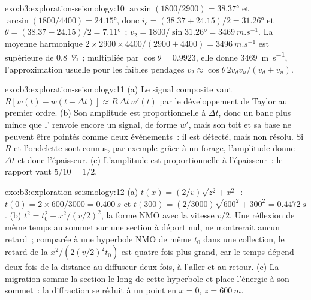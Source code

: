\begin{solution}{exo:b3:exploration-seismology:10}
$\arcsin(1800/2900) = \ang{38.37}$ et $\arcsin(1800/4400) = \ang{24.15}$, donc
$i_c = (38.37 + 24.15)/2 = \ang{31.26}$ et $\theta = (38.37 - 24.15)/2 =
\ang{7.11}$~; $v_2 = 1800/\sin\ang{31.26} = \qty{3469}{m.s^{-1}}$. La moyenne
harmonique $2\times2900\times4400/(2900 + 4400) = \qty{3496}{m.s^{-1}}$ est
supérieure de \qty{0.8}{\percent}~; multipliée par $\cos\theta = 0.9923$, elle donne
\qty{3469}{m.s^{-1}}, l'approximation usuelle pour les faibles pendages
$v_2 \approx \cos\theta\,2v_dv_u/(v_d + v_u)$.
\end{solution}

\begin{solution}{exo:b3:exploration-seismology:11}
(a) Le signal composite vaut $R[w(t) - w(t - \Delta t)] \approx R\,\Delta t\,w'(t)$ par
le développement de Taylor au premier ordre. (b) Son amplitude est proportionnelle à
$\Delta t$, donc un banc plus mince que l' renvoie encore un signal,
de forme $w'$, mais son toit et sa base ne peuvent être pointés comme deux événements~: il
est détecté, mais non résolu. Si $R$ et l'ondelette sont connus, par exemple grâce à un
forage, l'amplitude donne $\Delta t$ et donc l'épaisseur. (c) L'amplitude est
proportionnelle à l'épaisseur~: le rapport vaut $5/10 = 1/2$.
\end{solution}

\begin{solution}{exo:b3:exploration-seismology:12}
(a) $t(x) = (2/v)\sqrt{z^2 + x^2}$~: $t(0) = 2\times600/3000 = \qty{0.400}{s}$ et
$t(300) = (2/3000)\sqrt{600^2 + 300^2} = \qty{0.4472}{s}$. (b) $t^2 = t_0^2 +
x^2/(v/2)^2$, la forme NMO avec la vitesse $v/2$. Une réflexion de même temps au sommet
sur une section à déport nul, ne montrerait aucun retard~; comparée à une
hyperbole NMO de même $t_0$ dans une collection, le retard de la
$x^2/(2(v/2)^2t_0)$ est quatre fois plus grand, car le temps dépend deux fois de la
distance au diffuseur deux fois, à l'aller et au retour. (c) La migration somme la
section le long de cette hyperbole et place l'énergie à son sommet~: la diffraction
se réduit à un point en $x = 0$, $z = \qty{600}{m}$.
\end{solution}

